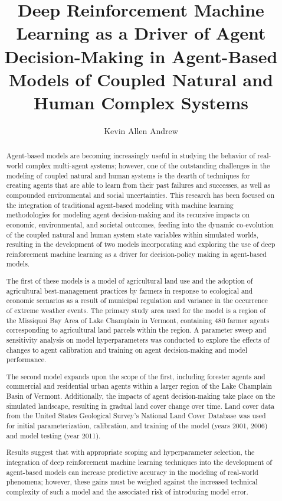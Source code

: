 \documentclass[12pt]{report}
\title{\vspace{-1cm}Deep Reinforcement Machine Learning as a Driver of Agent Decision-Making in Agent-Based Models of Coupled Natural and Human Complex Systems}
\author{Kevin Allen Andrew}
\begin{document}
\maketitle
{}

\begin{abstract}
	
\vspace{10mm}
Agent-based models are becoming increasingly useful in studying the behavior 
of real-world complex multi-agent systems; however, one of the outstanding 
challenges in the modeling of coupled natural and human systems is the 
dearth of techniques for creating agents that are able to learn from their
past failures and successes, as well as compounded environmental and social
uncertainties. This research has been focused on the integration of
traditional agent-based modeling with machine learning methodologies for
modeling agent decision-making and its recursive impacts on economic,
environmental, and societal outcomes, feeding into the dynamic co-evolution of
the coupled natural and human system state variables within simulated worlds,
resulting in the development of two models incorporating and exploring the use
of deep reinforcement machine learning as a driver for decision-policy making
in agent-based models.

The first of these models is a model of agricultural land use and the adoption
of agricultural best-management practices by farmers in response to ecological
and economic scenarios as a result of municipal regulation and variance in the
occurrence of extreme weather events. The primary study area used for the
model is a region of the Missiquoi Bay Area of Lake Champlain in Vermont,
containing 480 farmer agents corresponding to agricultural land parcels within
the region. A parameter sweep and sensitivity analysis on model
hyperparameters was conducted to explore the effects of changes to agent
calibration and training on agent decision-making and model performance.

The second model expands upon the scope of the first, including forester
agents and commercial and residential urban agents within a larger region of
the Lake Champlain Basin of Vermont. Additionally, the impacts of agent
decision-making take place on the simulated landscape, resulting in gradual
land cover change over time. Land cover data from the United States Geological
Survey's National Land Cover Database was used for initial parameterization,
calibration, and training of the model (years 2001, 2006) and model testing
(year 2011).

Results suggest that with appropriate scoping and hyperparameter selection,
the integration of deep reinforcement machine learning techniques into the
development of agent-based models can increase predictive accuracy in the
modeling of real-world phenomena; however, these gains must be weighed against
the increased technical complexity of such a model and the associated risk of 
introducing model error.

\end{abstract}
\end{document}

